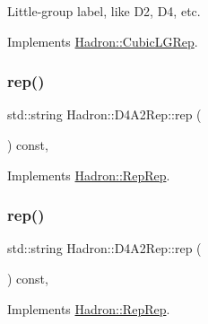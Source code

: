 Little-\/group label, like D2, D4, etc. 

Implements \mbox{\hyperlink{structHadron_1_1CubicLGRep_a9bdb14b519a611d21379ed96a3a9eb41}{Hadron\+::\+Cubic\+L\+G\+Rep}}.

\mbox{\label{structHadron_1_1D4A2Rep_aa51ab214e55a5545100ab53399ceb137}} 
\subsubsection{\texorpdfstring{rep()}{rep()}\hspace{0.1cm}{\footnotesize\ttfamily [1/5]}}
{\footnotesize\ttfamily std\+::string Hadron\+::\+D4\+A2\+Rep\+::rep (\begin{DoxyParamCaption}{ }\end{DoxyParamCaption}) const\hspace{0.3cm}{\ttfamily [inline]}, {\ttfamily [virtual]}}



Implements \mbox{\hyperlink{structHadron_1_1RepRep_ab3213025f6de249f7095892109575fde}{Hadron\+::\+Rep\+Rep}}.

\mbox{\label{structHadron_1_1D4A2Rep_aa51ab214e55a5545100ab53399ceb137}} 
\subsubsection{\texorpdfstring{rep()}{rep()}\hspace{0.1cm}{\footnotesize\ttfamily [2/5]}}
{\footnotesize\ttfamily std\+::string Hadron\+::\+D4\+A2\+Rep\+::rep (\begin{DoxyParamCaption}{ }\end{DoxyParamCaption}) const\hspace{0.3cm}{\ttfamily [inline]}, {\ttfamily [virtual]}}



Implements \mbox{\hyperlink{structHadron_1_1RepRep_ab3213025f6de249f7095892109575fde}{Hadron\+::\+Rep\+Rep}}.

\mbox{\label{structHadron_1_1D4A2Rep_aa51ab214e55a5545100ab53399ceb137}} 

